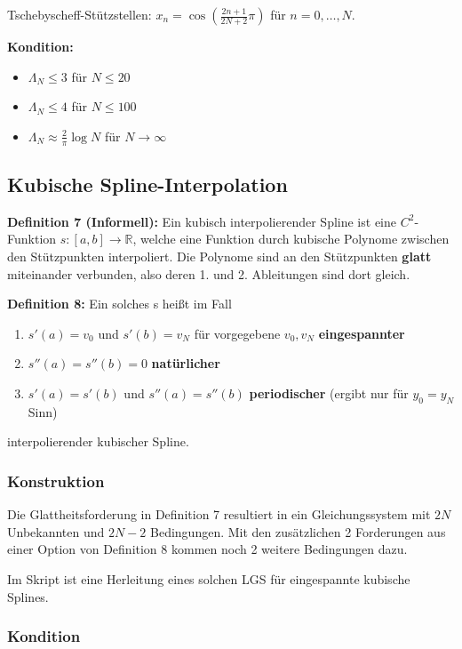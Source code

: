 \documentclass[a4paper]{article}
\begin{document}
Tschebyscheff-Stützstellen: $x_n = \cos(\frac{2n + 1}{2N + 2} \pi)$ für $n = 0,
\dots, N$.

\textbf{Kondition:}
\begin{itemize}
    \item $\Lambda_N \le 3$ für $N \le 20$
    \item $\Lambda_N \le 4$ für $N \le 100$
    \item $\Lambda_N \approx \frac{2}{\pi} \log N$ für $N \to \infty$
\end{itemize}

\subsection{Kubische Spline-Interpolation}

\textbf{Definition 7 (Informell):} Ein kubisch interpolierender Spline ist eine
$C^2$-Funktion $s: [a, b] \to \mathbb{R}$, welche eine Funktion durch kubische
Polynome zwischen den Stützpunkten interpoliert. Die Polynome sind an den
Stützpunkten \textbf{glatt} miteinander verbunden, also deren 1. und 2.
Ableitungen sind dort gleich.

\begin{samepage}
\textbf{Definition 8:} Ein solches s heißt im Fall
\begin{enumerate}
    \item $s'(a) = v_0$ und $s'(b) = v_N$ für vorgegebene $v_0, v_N$
    \textbf{eingespannter}
    \item $s''(a) = s''(b) = 0$ \textbf{natürlicher}
    \item $s'(a) = s'(b)$ und $s''(a) = s''(b)$ \textbf{periodischer}
    (ergibt nur für $y_0 = y_N$ Sinn)
\end{enumerate}
interpolierender kubischer Spline.
\end{samepage}

\subsubsection{Konstruktion}

Die Glattheitsforderung in Definition 7 resultiert in ein Gleichungssystem mit
$2N$ Unbekannten und $2N - 2$ Bedingungen. Mit den zusätzlichen 2 Forderungen
aus einer Option von Definition 8 kommen noch 2 weitere Bedingungen dazu.

Im Skript ist eine Herleitung eines solchen LGS für eingespannte kubische
Splines. 

\subsubsection{Kondition}
\end{document}
